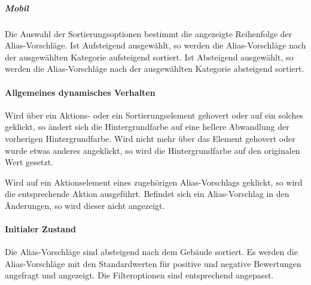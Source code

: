 \subparagraph*{Mobil}
Die Auswahl der Sortierungsoptionen bestimmt die angezeigte Reihenfolge der Alias-Vorschläge.
Ist \dq Aufsteigend \dq{} ausgewählt, so werden die Alias-Vorschläge nach der ausgewählten Kategorie aufsteigend sortiert.
Ist \dq Absteigend \dq{} ausgewählt, so werden die Alias-Vorschläge nach der ausgewählten Kategorie absteigend sortiert.

\paragraph*{Allgemeines dynamisches Verhalten}
Wird über ein Aktions- oder ein Sortierungselement gehovert oder auf ein solches geklickt, so ändert sich die Hintergrundfarbe auf eine hellere Abwandlung der vorherigen Hintergrundfarbe.
Wird nicht mehr über das Element gehovert oder wurde etwas anderes angeklickt, so wird die Hintergrundfarbe auf den originalen Wert gesetzt.

Wird auf ein Aktionselement eines zugehörigen Alias-Vorschlags geklickt, so wird die entsprechende Aktion ausgeführt.
Befindet sich ein Alias-Vorschlag in den Änderungen, so wird dieser nicht angezeigt.

\paragraph*{Initialer Zustand}
Die Alias-Vorschläge sind absteigend nach dem Gebäude sortiert.
Es werden die Alias-Vorschläge mit den Standardwerten für positive und negative Bewertungen angefragt und angezeigt.
Die Filteroptionen sind entsprechend angepasst.